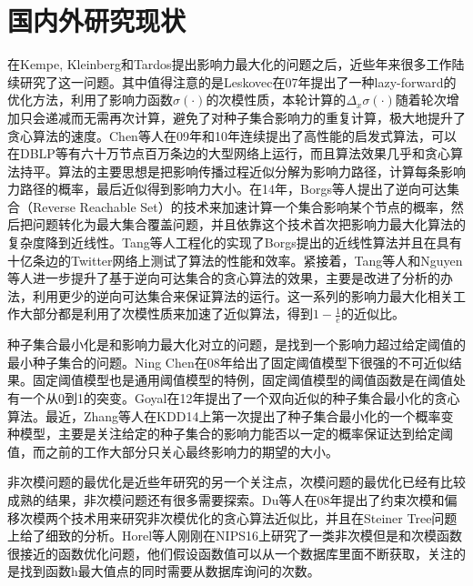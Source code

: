 \section{国内外研究现状}
在Kempe, Kleinberg和Tardos\cite{Kempe2003maximizing}提出影响力最大化的问题之后，近些年来很多工作陆续研究了这一问题\cite{bharathi2007competitive,Leskovec2007celf,Chen2009efficient,chen2010sharpphard,Goyal2011simpath}。其中值得注意的是Leskovec\cite{Leskovec2007celf}在07年提出了一种lazy-forward的优化方法，利用了影响力函数$\sigma(\cdot)$的次模性质，本轮计算的$\Delta_x\sigma(\cdot)$随着轮次增加只会递减而无需再次计算，避免了对种子集合影响力的重复计算，极大地提升了贪心算法的速度。Chen等人在09年\cite{Chen2009efficient}和10年\cite{chen2010sharpphard}连续提出了高性能的启发式算法，可以在DBLP等有六十万节点百万条边的大型网络上运行，而且算法效果几乎和贪心算法持平。算法的主要思想是把影响传播过程近似分解为影响力路径，计算每条影响力路径的概率，最后近似得到影响力大小。在14年，Borgs等人\cite{borgs2014rrset}提出了逆向可达集合（Reverse Reachable Set）的技术来加速计算一个集合影响某个节点的概率，然后把问题转化为最大集合覆盖问题，并且依靠这个技术首次把影响力最大化算法的复杂度降到近线性。Tang等人\cite{tang2014newrrset}工程化的实现了Borgs提出的近线性算法并且在具有十亿条边的Twitter网络上测试了算法的性能和效率。紧接着，Tang等人\cite{tang2015influence}和Nguyen等人\cite{mtai2016sigmod}进一步提升了基于逆向可达集合的贪心算法的效果，主要是改进了分析的办法，利用更少的逆向可达集合来保证算法的运行。这一系列的影响力最大化相关工作大部分都是利用了次模性质来加速了近似算法，得到$1-\frac{1}{e}$的近似比。

种子集合最小化是和影响力最大化对立的问题，是找到一个影响力超过给定阈值的最小种子集合的问题。Ning Chen在08年\cite{Chen2008approximability}给出了固定阈值模型下很强的不可近似结果。固定阈值模型也是通用阈值模型的特例，固定阈值模型的阈值函数是在阈值处有一个从0到1的突变。Goyal在12年\cite{goyal2012minimizing}提出了一个双向近似的种子集合最小化的贪心算法。最近，Zhang等人\cite{zhang2014prob}在KDD14上第一次提出了种子集合最小化的一个概率变种模型，主要是关注给定的种子集合的影响力能否以一定的概率保证达到给定阈值，而之前的工作大部分只关心最终影响力的期望的大小。


非次模问题的最优化是近些年研究的另一个关注点，次模问题的最优化已经有比较成熟的结果，非次模问题还有很多需要探索。Du等人\cite{du2008analysis}在08年提出了约束次模和偏移次模两个技术用来研究非次模优化的贪心算法近似比，并且在Steiner Tree问题上给了细致的分析。Horel等人\cite{Horel2016sub}刚刚在NIPS16上研究了一类非次模但是和次模函数很接近的函数优化问题，他们假设函数值可以从一个数据库里面不断获取，关注的是找到函数h最大值点的同时需要从数据库询问的次数。

